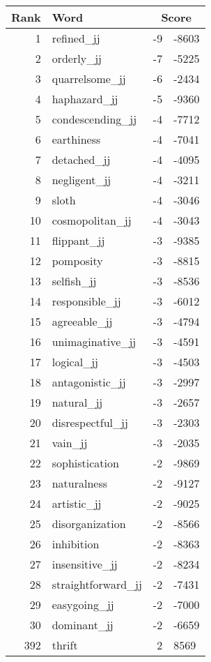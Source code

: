 \begin{longtable}[!htbp]{| rlr@{.}l |}
    \hline
    \textbf{Rank} & \textbf{Word} & \multicolumn{2}{c|}{\textbf{Score}} \\
    \hline
    \endhead
    1 & refined\_jj & -9 & -8603 \\
    2 & orderly\_jj & -7 & -5225 \\
    3 & quarrelsome\_jj & -6 & -2434 \\
    4 & haphazard\_jj & -5 & -9360 \\
    5 & condescending\_jj & -4 & -7712 \\
    6 & earthiness & -4 & -7041 \\
    7 & detached\_jj & -4 & -4095 \\
    8 & negligent\_jj & -4 & -3211 \\
    9 & sloth & -4 & -3046 \\
    10 & cosmopolitan\_jj & -4 & -3043 \\
    11 & flippant\_jj & -3 & -9385 \\
    12 & pomposity & -3 & -8815 \\
    13 & selfish\_jj & -3 & -8536 \\
    14 & responsible\_jj & -3 & -6012 \\
    15 & agreeable\_jj & -3 & -4794 \\
    16 & unimaginative\_jj & -3 & -4591 \\
    17 & logical\_jj & -3 & -4503 \\
    18 & antagonistic\_jj & -3 & -2997 \\
    19 & natural\_jj & -3 & -2657 \\
    20 & disrespectful\_jj & -3 & -2303 \\
    21 & vain\_jj & -3 & -2035 \\
    22 & sophistication & -2 & -9869 \\
    23 & naturalness & -2 & -9127 \\
    24 & artistic\_jj & -2 & -9025 \\
    25 & disorganization & -2 & -8566 \\
    26 & inhibition & -2 & -8363 \\
    27 & insensitive\_jj & -2 & -8234 \\
    28 & straightforward\_jj & -2 & -7431 \\
    29 & easygoing\_jj & -2 & -7000 \\
    30 & dominant\_jj & -2 & -6659 \\
    392 & thrift & 2 & 8569 \\

\end{longtable}

